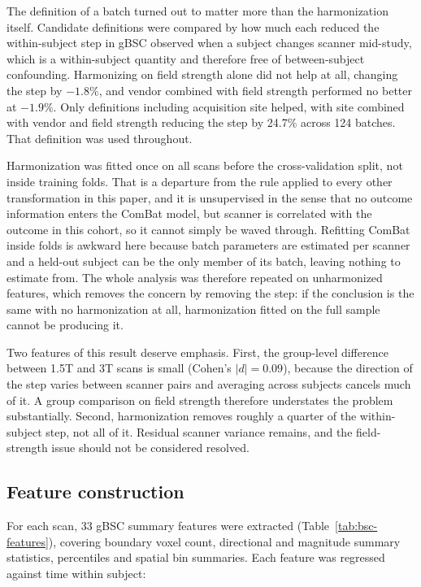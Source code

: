 \documentclass[blue]{ludusofficial}  %
\begin{document}
The definition of a batch turned out to matter more than the harmonization itself. Candidate definitions were compared by how much each reduced the within-subject step in gBSC observed when a subject changes scanner mid-study, which is a within-subject quantity and therefore free of between-subject confounding. Harmonizing on field strength alone did not help at all, changing the step by $-1.8\%$, and vendor combined with field strength performed no better at $-1.9\%$. Only definitions including acquisition site helped, with site combined with vendor and field strength reducing the step by 24.7\% across 124 batches. That definition was used throughout.

Harmonization was fitted once on all scans before the cross-validation split, not inside training folds. That is a departure from the rule applied to every other transformation in this paper, and it is unsupervised in the sense that no outcome information enters the ComBat model, but scanner is correlated with the outcome in this cohort, so it cannot simply be waved through. Refitting ComBat inside folds is awkward here because batch parameters are estimated per scanner and a held-out subject can be the only member of its batch, leaving nothing to estimate from. The whole analysis was therefore repeated on unharmonized features, which removes the concern by removing the step: if the conclusion is the same with no harmonization at all, harmonization fitted on the full sample cannot be producing it.

Two features of this result deserve emphasis. First, the group-level difference between 1.5T and 3T scans is small (Cohen's $|d| = 0.09$), because the direction of the step varies between scanner pairs and averaging across subjects cancels much of it. A group comparison on field strength therefore understates the problem substantially. Second, harmonization removes roughly a quarter of the within-subject step, not all of it. Residual scanner variance remains, and the field-strength issue should not be considered resolved.


\subsection{Feature construction}

For each scan, 33 gBSC summary features were extracted (Table~\ref{tab:bsc-features}), covering boundary voxel count, directional and magnitude summary statistics, percentiles and spatial bin summaries. Each feature was regressed against time within subject:
\end{document}
